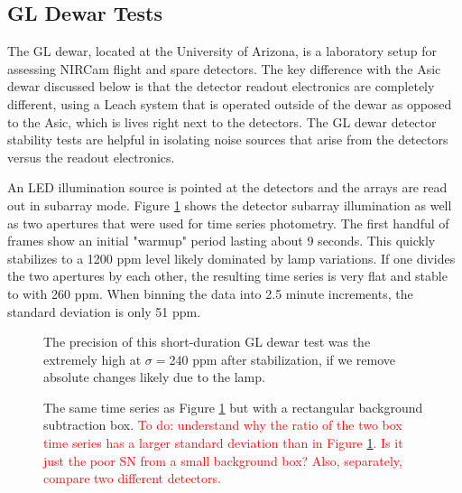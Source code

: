 \documentclass{aastex62}
\begin{document}
{\subsection{GL Dewar Tests}

The GL dewar, located at the University of Arizona, is a laboratory setup for assessing NIRCam flight and spare detectors.
The key difference with the Asic dewar discussed below is that the detector readout electronics are completely different, using a Leach system that is operated outside of the dewar as opposed to the Asic, which is lives right next to the detectors.
The GL dewar detector stability tests are helpful in isolating noise sources that arise from the detectors versus the readout electronics.

An LED illumination source is pointed at the detectors and the arrays are read out in subarray mode.
Figure \ref{fig:GLtSeries} shows the detector subarray illumination as well as two apertures that were used for time series photometry.
The first handful of frames show an initial "warmup" period lasting about 9 seconds.
This quickly stabilizes to a 1200 ppm level likely dominated by lamp variations.
If one divides the two apertures by each other, the resulting time series is very flat and stable to with 260 ppm.
When binning the data into 2.5 minute increments, the standard deviation is only 51 ppm.


\begin{figure}
\caption{The precision of this short-duration GL dewar test was the extremely high at $\sigma=$240 ppm after stabilization, if we remove absolute changes likely due to the lamp.
}\label{fig:GLtSeries}
\end{figure}

\begin{figure}
\caption{The same time series as Figure \ref{fig:GLtSeries} but with a rectangular background subtraction box.
\textcolor{red}{To do: understand why the ratio of the two box time series has a larger standard deviation than in Figure \ref{fig:GLtSeries}. Is it just the poor SN from a small background box? Also, separately, compare two different detectors.}
}\label{fig:GLtSeriesBacksub}
\end{figure}

}
\end{document}
